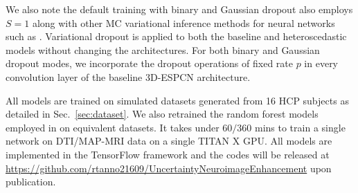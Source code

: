 We also note the default training with binary and Gaussian dropout also employs $S=1$ \cite {srivastava2014dropout} along with other MC variational inference methods for neural networks such as \cite{kingma2013auto,kingma2015variational,gal2017concrete}. Variational dropout is applied to both the baseline and heteroscedastic models without changing the architectures. For both binary and Gaussian dropout modes, we incorporate the dropout operations of fixed rate $p$ in every convolution layer of the baseline 3D-ESPCN architecture. 

All models are trained on simulated datasets generated from 16 HCP subjects as detailed in Sec.~\ref{sec:dataset}. We also retrained the random forest models employed in \cite{tanno2016bayesian,alexander2017image} on equivalent datasets. It takes under $60/360$ mins to train a single network on DTI/MAP-MRI data on a single TITAN X GPU. All models are implemented in the TensorFlow framework \cite{abadi2016tensorflow} and the codes will be released at \url{https://github.com/rtanno21609/UncertaintyNeuroimageEnhancement} upon publication. 


